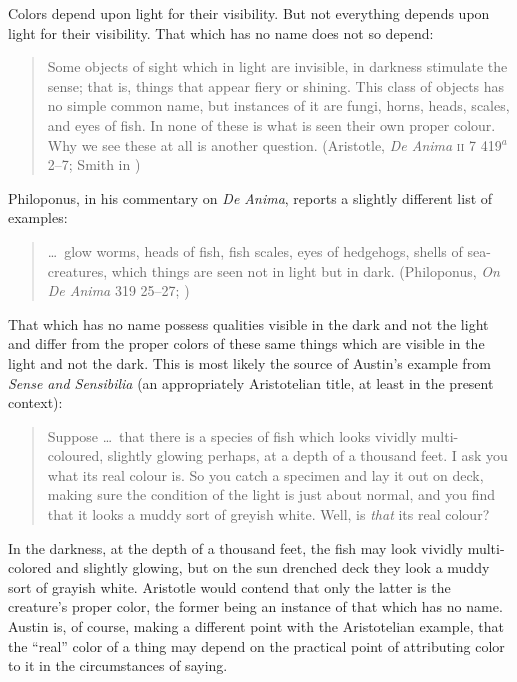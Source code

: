 Colors depend upon light for their visibility. But not everything depends upon light for their visibility. That which has no name does not so depend:
\begin{quote}
	Some objects of sight which in light are invisible, in darkness stimulate the sense; that is, things that appear fiery or shining. This class of objects has no simple common name, but instances of it are fungi, horns, heads, scales, and eyes of fish. In none of these is what is seen their own proper colour. Why we see these at all is another question. (Aristotle, \emph{De Anima} \textsc{ii} 7 419\( ^{a} \)2--7; Smith in \citealt[33]{Barnes:1984uq})
\end{quote}
Philoponus, in his commentary on \emph{De Anima}, reports a slightly different list of examples:
\begin{quote}
	\ldots\ glow worms, heads of fish, fish scales, eyes of hedgehogs, shells of sea-creatures, which things are seen not in light but in dark. (Philoponus, \emph{On \emph{De Anima}} 319 25--27; \citealt[3]{Charlton:2005fk})
\end{quote}
That which has no name possess qualities visible in the dark and not the light and differ from the proper colors of these same things which are visible in the light and not the dark. This is most likely the source of Austin's example from \emph{Sense and Sensibilia} (an appropriately Aristotelian title, at least in the present context):
\begin{quote}
	Suppose \ldots\ that there is a species of fish which looks vividly multi-coloured, slightly glowing perhaps, at a depth of a thousand feet. I ask you what its real colour is. So you catch a specimen and lay it out on deck, making sure the condition of the light is just about normal, and you find that it looks a muddy sort of greyish white. Well, is \emph{that} its real colour? \citep[lecture \textsc{vii}, 65--66]{Austin:1962lr}
\end{quote}
In the darkness, at the depth of a thousand feet, the fish may look vividly multi-colored and slightly glowing, but on the sun drenched deck they look a muddy sort of grayish white. Aristotle would contend that only the latter is the creature's proper color, the former being an instance of that which has no name. Austin is, of course, making a different point with the Aristotelian example, that the ``real'' color of a thing may depend on the practical point of attributing color to it in the circumstances of saying.

